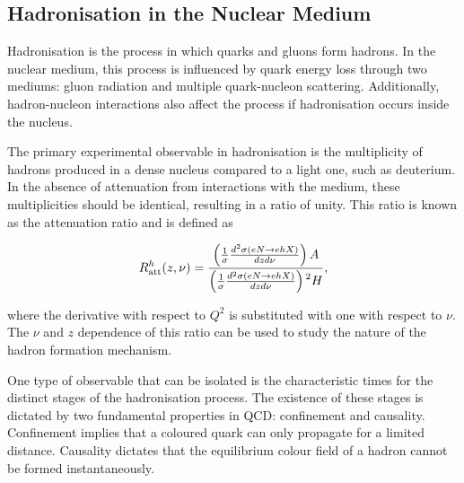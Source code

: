 \subsection{Hadronisation in the Nuclear Medium}
\label{ssec::hadronisation_in_the_nuclear_medium}
    Hadronisation is the process in which quarks and gluons form hadrons.
    In the nuclear medium, this process is influenced by quark energy loss through two mediums: gluon radiation and multiple quark-nucleon scattering.
    Additionally, hadron-nucleon interactions also affect the process if hadronisation occurs inside the nucleus.

    The primary experimental observable in hadronisation is the multiplicity of hadrons produced in a dense nucleus compared to a light one, such as deuterium.
    In the absence of attenuation from interactions with the medium, these multiplicities should be identical, resulting in a ratio of unity.
    This ratio is known as the attenuation ratio and is defined as

    \begin{equation*}
        R^h_{\text{att}}(z,\nu) = \frac
            {\left( \frac{1}{\sigma} \frac{d^2\sigma(eN \rightarrow ehX)}{dzd\nu} \right)A}
            {\left( \frac{1}{\sigma} \frac{d^2\sigma(eN \rightarrow ehX)}{dzd\nu} \right){\prescript{2}{}{H}}},
    \end{equation*}

    where the derivative with respect to $Q^2$ is substituted with one with respect to $\nu$.
    The $\nu$ and $z$ dependence of this ratio can be used to study the nature of the hadron formation mechanism.

    One type of observable that can be isolated is the characteristic times for the distinct stages of the hadronisation process.
    The existence of these stages is dictated by two fundamental properties in QCD: confinement and causality.
    Confinement implies that a coloured quark can only propagate for a limited distance.
    Causality dictates that the equilibrium colour field of a hadron cannot be formed instantaneously.

    
    
    
